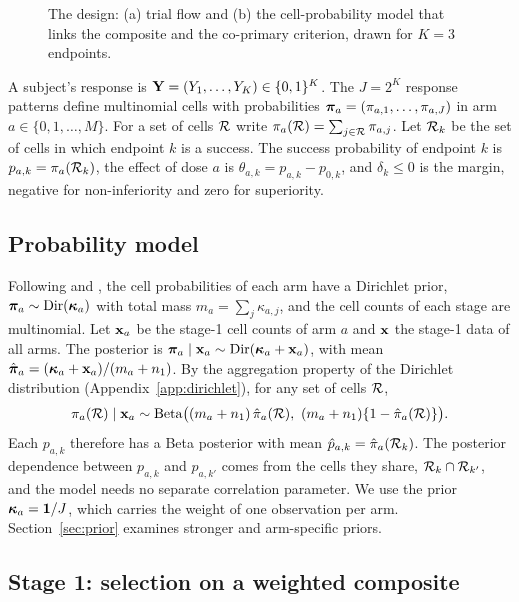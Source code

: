 \begin{figure}
\centering
\resizebox{\textwidth}{!}{}
\caption{The design: (a) trial flow and (b) the cell-probability model that links the composite and the co-primary criterion, drawn for $K=3$ endpoints.}\label{fig:schematic}
\end{figure}

A subject's response is $\mathbf{Y}=(Y_1,\dots,Y_K)\in\{0,1\}^K$. The $J=2^K$ response patterns define multinomial cells with probabilities $\bm{\pi}_a=(\pi_{a,1},\dots,\pi_{a,J})$ in arm $a\in\{0,1,\dots,M\}$. For a set of cells $\mathcal{R}$ write $\pi_a(\mathcal{R})=\sum_{j\in\mathcal{R}}\pi_{a,j}$. Let $\mathcal{R}_k$ be the set of cells in which endpoint $k$ is a success. The success probability of endpoint $k$ is $p_{a,k}=\pi_a(\mathcal{R}_k)$, the effect of dose $a$ is $\theta_{a,k}=p_{a,k}-p_{0,k}$, and $\delta_k\le0$ is the margin, negative for non-inferiority and zero for superiority.

\subsection{Probability model}\label{sec:model}

Following \citet{thall1995} and \citet{yang2024}, the cell probabilities of each arm have a Dirichlet prior, $\bm{\pi}_a\sim\mathrm{Dir}(\bm{\kappa}_a)$ with total mass $m_a=\sum_j\kappa_{a,j}$, and the cell counts of each stage are multinomial. Let $\mathbf{x}_a$ be the stage-1 cell counts of arm $a$ and $\mathbf{x}$ the stage-1 data of all arms. The posterior is $\bm{\pi}_a\mid\mathbf{x}_a\sim\mathrm{Dir}(\bm{\kappa}_a+\mathbf{x}_a)$, with mean $\hat{\bm{\pi}}_a=(\bm{\kappa}_a+\mathbf{x}_a)/(m_a+n_1)$. By the aggregation property of the Dirichlet distribution (Appendix~\ref{app:dirichlet}), for any set of cells $\mathcal{R}$,
\begin{equation}\label{eq:beta}
\pi_a(\cR)\mid\bx_a\sim\Beta\big((m_a+n_1)\,\hat\pi_a(\cR),\ (m_a+n_1)\{1-\hat\pi_a(\cR)\}\big).
\end{equation}
Each $p_{a,k}$ therefore has a Beta posterior with mean $\hat p_{a,k}=\hat\pi_a(\mathcal{R}_k)$. The posterior dependence between $p_{a,k}$ and $p_{a,k'}$ comes from the cells they share, $\mathcal{R}_k\cap\mathcal{R}_{k'}$, and the model needs no separate correlation parameter. We use the prior $\bm{\kappa}_a=\mathbf 1/J$, which carries the weight of one observation per arm. Section~\ref{sec:prior} examines stronger and arm-specific priors.

\subsection{Stage 1: selection on a weighted composite}\label{sec:stage1}

